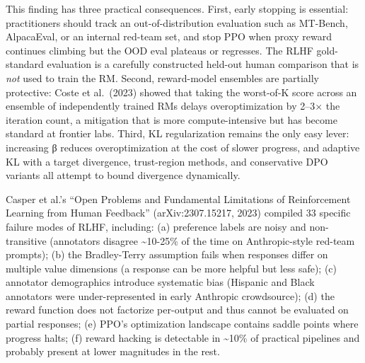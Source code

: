 This finding has three practical consequences. First, early stopping is essential: practitioners should track an out-of-distribution evaluation such as MT-Bench, AlpacaEval, or an internal red-team set, and stop PPO when proxy reward continues climbing but the OOD eval plateaus or regresses. The RLHF gold-standard evaluation is a carefully constructed held-out human comparison that is \emph{not} used to train the RM. Second, reward-model ensembles are partially protective: Coste et al.~(2023) showed that taking the worst-of-K score across an ensemble of independently trained RMs delays overoptimization by 2--3× the iteration count, a mitigation that is more compute-intensive but has become standard at frontier labs. Third, KL regularization remains the only easy lever: increasing β reduces overoptimization at the cost of slower progress, and adaptive KL with a target divergence, trust-region methods, and conservative DPO variants all attempt to bound divergence dynamically.

Casper et al.'s ``Open Problems and Fundamental Limitations of Reinforcement Learning from Human Feedback'' (arXiv:2307.15217, 2023) compiled 33 specific failure modes of RLHF, including: (a) preference labels are noisy and non-transitive (annotators disagree \textasciitilde10-25\% of the time on Anthropic-style red-team prompts); (b) the Bradley-Terry assumption fails when responses differ on multiple value dimensions (a response can be more helpful but less safe); (c) annotator demographics introduce systematic bias (Hispanic and Black annotators were under-represented in early Anthropic crowdsource); (d) the reward function does not factorize per-output and thus cannot be evaluated on partial responses; (e) PPO's optimization landscape contains saddle points where progress halts; (f) reward hacking is detectable in \textasciitilde10\% of practical pipelines and probably present at lower magnitudes in the rest.

